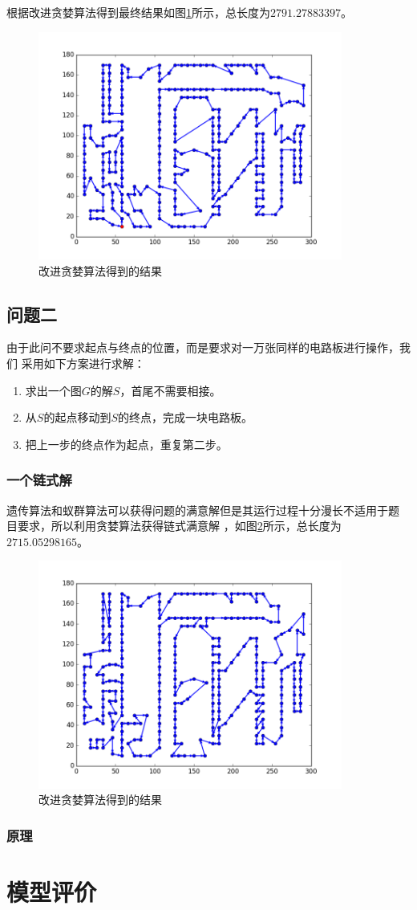 \documentclass[fontset=windows,a4paper,12pt]{ctexart}
\begin{document}
        根据改进贪婪算法得到最终结果如图\ref{fig:greedy}所示，总长度为$2791.27883397$。
		\begin{figure}[htbp]
			\centering
			\includegraphics[width=10cm]{pic/greedy_result.png}
			\caption{改进贪婪算法得到的结果}
			\label{fig:greedy}
		\end{figure}

    \subsection{问题二}
	  由于此问不要求起点与终点的位置，而是要求对一万张同样的电路板进行操作，我们
	  采用如下方案进行求解：
	  \begin{enumerate}
	  	\item 求出一个图$G$的解$S$，首尾不需要相接。
	  	\item 从$S$的起点移动到$S$的终点，完成一块电路板。
	  	\item 把上一步的终点作为起点，重复第二步。
	  \end{enumerate}
      \subsubsection{一个链式解}
        遗传算法和蚁群算法可以获得问题的满意解但是其运行过程十分漫长不适用于题
        目要求，所以利用贪婪算法获得链式满意解
        ，如图\ref{fig:greedy2}所示，总长度为$2715.05298165$。
        \begin{figure}[!htbp]
        	\centering
        	\includegraphics[width=10cm]{pic/greedy_result2.png}
        	\caption{改进贪婪算法得到的结果}
        	\label{fig:greedy2}
        \end{figure}
      \subsubsection{原理}
    \section{模型评价}
  
  
\end{document}
